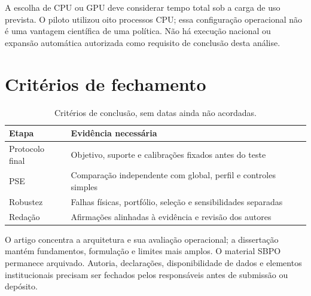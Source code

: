 A escolha de CPU ou GPU deve considerar tempo total sob a carga de uso prevista. O piloto utilizou oito processos CPU; essa configuração operacional não é uma vantagem científica de uma política. Não há execução nacional ou expansão automática autorizada como requisito de conclusão desta análise.

\section{Critérios de fechamento}
\begin{table}[htbp]\centering\small
\caption{Critérios de conclusão, sem datas ainda não acordadas.}\label{tab:cronograma}
\begin{tabular}{@{}p{4cm}p{8.8cm}@{}}\toprule
Etapa & Evidência necessária\\\midrule
Protocolo final & Objetivo, suporte e calibrações fixados antes do teste\\
PSE & Comparação independente com global, perfil e controles simples\\
Robustez & Falhas físicas, portfólio, seleção e sensibilidades separadas\\
Redação & Afirmações alinhadas à evidência e revisão dos autores\\\bottomrule
\end{tabular}\end{table}

O artigo concentra a arquitetura e sua avaliação operacional; a dissertação mantém fundamentos, formulação e limites mais amplos. O material SBPO permanece arquivado. Autoria, declarações, disponibilidade de dados e elementos institucionais precisam ser fechados pelos responsáveis antes de submissão ou depósito.
